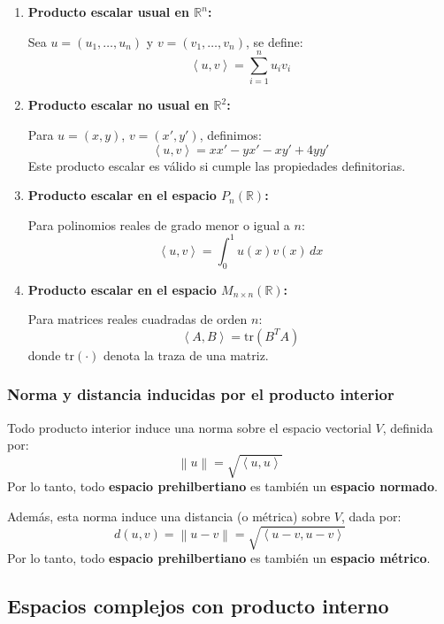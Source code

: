 \begin{enumerate}
  \item \textbf{Producto escalar usual en \(\mathbb{R}^n\):}

  Sea \(u = (u_1, \dots, u_n)\) y \(v = (v_1, \dots, v_n)\), se define:
  \[
    \left\langle u, v \right\rangle = \sum_{i=1}^{n} u_i v_i
  \]

  \item \textbf{Producto escalar no usual en \(\mathbb{R}^2\):}

  Para \(u = (x, y)\), \(v = (x', y')\), definimos:
  \[
    \left\langle u, v \right\rangle = x x' - y x' - x y' + 4 y y'
  \]
  Este producto escalar es válido si cumple las propiedades definitorias.

  \item \textbf{Producto escalar en el espacio \(P_n(\mathbb{R})\):}

  Para polinomios reales de grado menor o igual a \(n\):
  \[
    \left\langle u, v \right\rangle = \int_0^1 u(x) v(x) \, dx
  \]

  \item \textbf{Producto escalar en el espacio \(M_{n \times n}(\mathbb{R})\):}

  Para matrices reales cuadradas de orden \(n\):
  \[
    \left\langle A, B \right\rangle = \mathrm{tr}(B^T A)
  \]
  donde \(\mathrm{tr}(\cdot)\) denota la traza de una matriz.
\end{enumerate}

\subsubsection{Norma y distancia inducidas por el producto interior}

Todo producto interior induce una norma sobre el espacio vectorial \(V\), definida por:
\[
\left\lVert u \right\rVert = \sqrt{ \left\langle u, u \right\rangle }
\]
Por lo tanto, todo \textbf{espacio prehilbertiano} es también un \textbf{espacio normado}.

Además, esta norma induce una distancia (o métrica) sobre \(V\), dada por:
\[
d(u, v) = \left\lVert u - v \right\rVert = \sqrt{ \left\langle u - v, u - v \right\rangle }
\]
Por lo tanto, todo \textbf{espacio prehilbertiano} es también un \textbf{espacio métrico}.

\subsection{Espacios complejos con producto interno}

